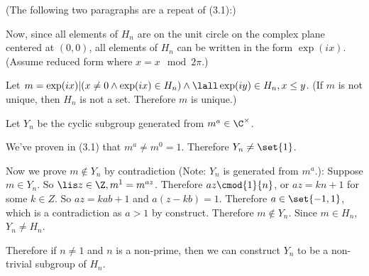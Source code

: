         (The following two paragraphs are a repeat of (3.1):)

        Now, since all elements of $H_n$ are on the unit circle on the complex plane centered at $(0,0)$,
        all elements of $H_n$ can be written in the form $\exp(ix)$.
        (Assume reduced form where $x = x\mod 2\pi$.)
        
        Let $m = \exp(ix) |( x \neq 0 \land \exp(ix) \in H_n) \land \lall \exp(iy) \in H_n, x \leq y$.
        (If $m$ is not unique, then $H_n$ is not a set. Therefore $m$ is unique.)

        Let $Y_n$ be the cyclic subgroup generated from $m^a \in \C^\times$.

        We've proven in (3.1) that $m^a \neq m^0 = 1$.
        Therefore $Y_n \neq \set{1}$.

        Now we prove $m \not\in Y_n$ by contradiction (Note: $Y_n$ is generated from $m^a$.):
        Suppose $m \in Y_n$.
        So $\lis z \in \Z, m^1 = m^{az}$.
        Therefore $az \cmod{1}{n}$, or $az = kn + 1$ for some $k \in Z$.
        So $az = kab + 1$ and $a(z - kb) = 1$.
        Therefore $a \in \set{-1,1}$,
        which is a contradiction as $a > 1$ by construct.
        Therefore $m \not\in Y_n$.
        Since $m \in H_n$, $Y_n \neq H_n$.

        Therefore if $n \neq 1$ and $n$ is a non-prime, 
        then we can construct $Y_n$ to be a non-trivial subgroup of $H_n$.